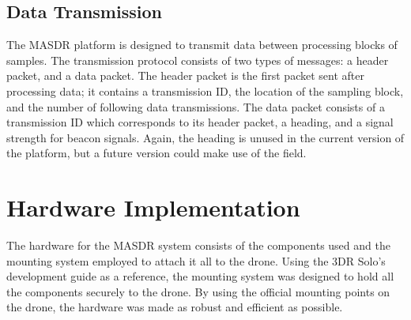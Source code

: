 \subsection{Data Transmission}
The MASDR platform is designed to transmit data between processing blocks of samples. The transmission protocol consists of two types of messages: a header packet, and a data packet. The header packet is the first packet sent after processing data; it contains a transmission ID, the location of the sampling block, and the number of following data transmissions. The data packet consists of a transmission ID which corresponds to its header packet, a heading, and a signal strength for beacon signals. Again, the heading is unused in the current version of the platform, but a future version could make use of the field.

\section{Hardware Implementation}
The hardware for the MASDR system consists of the components used and the mounting system employed to attach it all to the drone. Using the 3DR Solo’s development guide as a reference, the mounting system was designed to hold all the components securely to the drone. By using the official mounting points on the drone, the hardware was made as robust and efficient as possible.
